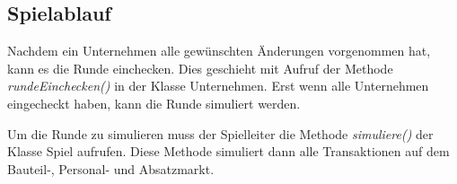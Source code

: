 \subsection{Spielablauf}
\label{sub:fachkonzept-implementierung-spielablauf}

Nachdem ein Unternehmen alle gewünschten Änderungen vorgenommen hat, kann es die Runde einchecken. Dies geschieht
mit Aufruf der Methode \textit{rundeEinchecken()} in der Klasse Unternehmen. Erst wenn alle Unternehmen eingecheckt haben,
kann die Runde simuliert werden.

Um die Runde zu simulieren muss der Spielleiter die Methode \textit{simuliere()} der Klasse Spiel aufrufen. Diese Methode
simuliert dann alle Transaktionen auf dem Bauteil-, Personal- und Absatzmarkt.

\autorende